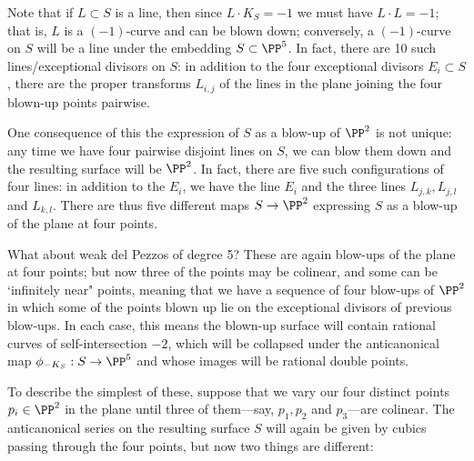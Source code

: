Note that if $L \subset S$ is a line, then since $L \cdot K_S = -1$ we must have $L\cdot L = -1$; that is, $L$ is a $(-1)$-curve and can be blown down; conversely, a $(-1)$-curve on $S$ will be a line under the embedding $S \subset \PP^5$. In fact, there are 10 such lines/exceptional divisors on $S$: in addition to the four exceptional divisors $E_i \subset S$, there are the proper transforms $L_{i,j}$ of the lines in the plane joining the four blown-up points pairwise.

One consequence of this the expression of $S$ as a blow-up of $\PP^2$ is not unique: any time we have four pairwise disjoint lines on $S$, we can blow them down and the resulting surface will be $\PP^2$. In fact, there are five such configurations of four lines: in addition to the $E_i$, we have the line $E_i$ and the three lines $L_{j,k}, L_{j,l}$ and $L_{k,l}$. There are thus five different maps $S \to \PP^2$ expressing $S$ as a blow-up of the plane at four points.

What about weak del Pezzos of degree 5? These are again blow-ups of the plane at four points; but now three of the points may be colinear, and some can be `infinitely near" points, meaning that we have a sequence of four blow-ups of $\PP^2$ in which some of the points blown up lie on the exceptional divisors of previous blow-ups. In each case, this means the blown-up surface will contain rational curves of self-intersection $-2$, which will be collapsed under the anticanonical map $\phi_{-K_S} : S \to \PP^5$ and whose images will be rational double points.

To describe the simplest of these, suppose that we vary our four distinct points  $p_i \in \PP^2$ in the plane until three of them---say, $p_1, p_2$ and $p_3$---are colinear. The anticanonical series on the resulting surface $S$ will again be given by cubics passing through the four points, but now two things are different:

